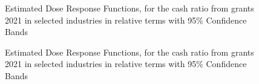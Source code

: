 \begin{figure}
    \centering
    
    \decoRule
    \caption[Response curves for liquidity through aid - by sectors 1]{Estimated Dose Response Functions, for the cash ratio from grants 2021 in selected industries in relative terms with 95\% Confidence Bands}
    \label{fig:Curve3}
\end{figure}


\begin{figure}
    \centering
    
    \decoRule
    \caption[Response curves for liquidity through aid - by sectors 2]{Estimated Dose Response Functions, for the cash ratio from grants 2021 in selected industries in relative terms with 95\% Confidence Bands}
    \label{fig:Curve4}
\end{figure}